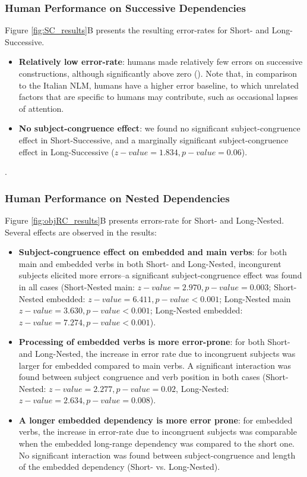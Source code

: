 \subsubsection{Human Performance on Successive Dependencies}
Figure \ref{fig:SC_results}B presents the resulting error-rates for Short- and Long-Successive. 
\begin{itemize}
    \item \textbf{Relatively low error-rate}: humans made relatively few errors on successive constructions, although significantly above zero (). Note that, in comparison to the Italian NLM, humans have a higher error baseline, to which unrelated factors that are specific to humans may contribute, such as occasional lapses of attention.
    \item \textbf{No subject-congruence effect}: we found no significant subject-congruence effect in Short-Successive, and a marginally significant subject-congruence effect in Long-Successive ($z-value=1.834, p-value=0.06$).
\end{itemize}
.

\subsubsection{Human Performance on Nested Dependencies}
Figure \ref{fig:objRC_results}B presents errors-rate for Short- and Long-Nested. Several effects are observed in the results: 
\begin{itemize}
    \item \textbf{Subject-congruence effect on embedded and main verbs}: for both main and embedded verbs in both Short- and Long-Nested, incongurent subjects elicited more errors--a significant subject-congruence effect was found in all cases (Short-Nested main: $z-value=2.970, p-value=0.003$; Short-Nested embedded: $z-value=6.411, p-value<0.001$; Long-Nested main $z-value=3.630, p-value<0.001$; Long-Nested embedded: $z-value=7.274, p-value<0.001$).
    \item \textbf{Processing of embedded verbs is more error-prone}: for both Short- and Long-Nested, the increase in error rate due to incongruent subjects was larger for embedded compared to main verbs. A significant interaction was found between subject congruence and verb position in both cases (Short-Nested: $z-value=2.277, p-value = 0.02$, Long-Nested: $z-value=2.634, p-value = 0.008$).
    \item \textbf{A longer embedded dependency is more error prone}: for embedded verbs, the increase in error-rate due to incongruent subjects was comparable when the embedded long-range dependency was compared to the short one. No significant interaction was found between subject-congruence and length of the embedded dependency (Short- vs. Long-Nested).
\end{itemize}

